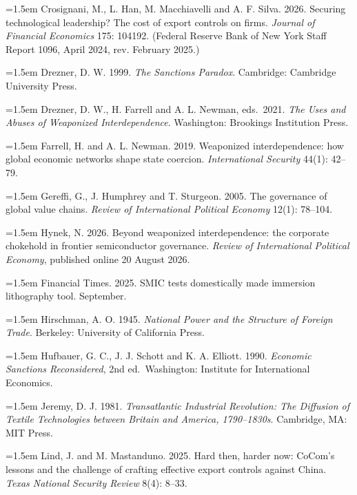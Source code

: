 \documentclass[12pt]{article}
\begin{document}
\par\noindent\hangindent=1.5em 
  Crosignani, M., L. Han, M. Macchiavelli and A. F. Silva. 2026. Securing technological leadership? The cost of export controls on firms. \emph{Journal of Financial Economics} 175: 104192. (Federal Reserve Bank of New York Staff Report 1096, April 2024, rev. February 2025.)
\par\noindent\hangindent=1.5em 
  Drezner, D. W. 1999. \emph{The Sanctions Paradox}. Cambridge: Cambridge University Press.
\par\noindent\hangindent=1.5em 
  Drezner, D. W., H. Farrell and A. L. Newman, eds.~2021. \emph{The Uses and Abuses of Weaponized Interdependence}. Washington: Brookings Institution Press.
\par\noindent\hangindent=1.5em 
  Farrell, H. and A. L. Newman. 2019. Weaponized interdependence: how global economic networks shape state coercion. \emph{International Security} 44(1): 42--79.
\par\noindent\hangindent=1.5em 
  Gereffi, G., J. Humphrey and T. Sturgeon. 2005. The governance of global value chains. \emph{Review of International Political Economy} 12(1): 78--104.
\par\noindent\hangindent=1.5em 
  Hynek, N. 2026. Beyond weaponized interdependence: the corporate chokehold in frontier semiconductor governance. \emph{Review of International Political Economy}, published online 20 August 2026.
\par\noindent\hangindent=1.5em 
  Financial Times. 2025. SMIC tests domestically made immersion lithography tool. September.
\par\noindent\hangindent=1.5em 
  Hirschman, A. O. 1945. \emph{National Power and the Structure of Foreign Trade}. Berkeley: University of California Press.
\par\noindent\hangindent=1.5em 
  Hufbauer, G. C., J. J. Schott and K. A. Elliott. 1990. \emph{Economic Sanctions Reconsidered}, 2nd ed.~Washington: Institute for International Economics.
\par\noindent\hangindent=1.5em 
  Jeremy, D. J. 1981. \emph{Transatlantic Industrial Revolution: The Diffusion of Textile Technologies between Britain and America, 1790--1830s}. Cambridge, MA: MIT Press.
\par\noindent\hangindent=1.5em 
  Lind, J. and M. Mastanduno. 2025. Hard then, harder now: CoCom's lessons and the challenge of crafting effective export controls against China. \emph{Texas National Security Review} 8(4): 8--33.
\end{document}
